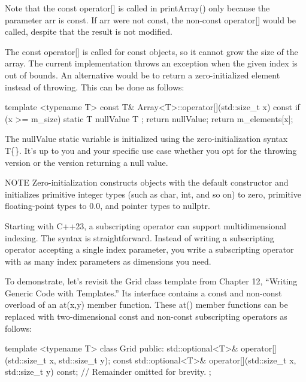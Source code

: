 Note that the const operator[] is called in printArray() only because the parameter arr is const. If arr were not const, the non-const operator[] would be called, despite that the result is not modified.

The const operator[] is called for const objects, so it cannot grow the size of the array. The current implementation throws an exception when the given index is out of bounds. An alternative would be to return a zero-initialized element instead of throwing. This can be done as follows:

\begin{cpp}
template <typename T> const T& Array<T>::operator[](std::size_t x) const
{
    if (x >= m_size) {
        static T nullValue { T{} };
        return nullValue;
    }
    return m_elements[x];
}
\end{cpp}

The nullValue static variable is initialized using the zero-initialization syntax T\{\}. It’s up to you and your specific use case whether you opt for the throwing version or the version returning a null value.

\begin{myNotic}{NOTE}
Zero-initialization constructs objects with the default constructor and initializes primitive integer types (such as char, int, and so on) to zero, primitive floating-point types to 0.0, and pointer types to nullptr.
\end{myNotic}



Starting with C++23, a subscripting operator can support multidimensional indexing. The syntax is straightforward. Instead of writing a subscripting operator accepting a single index parameter, you write a subscripting operator with as many index parameters as dimensions you need.

To demonstrate, let’s revisit the Grid class template from Chapter 12, “Writing Generic Code with Templates.” Its interface contains a const and non-const overload of an at(x,y) member function. These at() member functions can be replaced with two-dimensional const and non-const subscripting operators as follows:

\begin{cpp}
template <typename T>
class Grid
{
    public:
        std::optional<T>& operator[](std::size_t x, std::size_t y);
        const std::optional<T>& operator[](std::size_t x, std::size_t y) const;
        // Remainder omitted for brevity.
};
\end{cpp}

